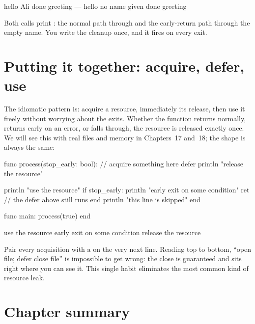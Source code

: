 \begin{progout}
hello
Ali
done greeting
---
hello
no name given
done greeting
\end{progout}

Both calls print : the normal path through  and
the early-return path through the empty name. You write the cleanup once, and it
fires on every exit.

\section{Putting it together: acquire, defer, use}

The idiomatic pattern is: acquire a resource, immediately  its
release, then use it freely without worrying about the exits. Whether the function
returns normally, returns early on an error, or falls through, the resource is
released exactly once. We will see this with real files and memory in Chapters~17
and~18; the shape is always the same:

\begin{salamen}
func process(stop_early: bool):
    // acquire something here
    defer println "release the resource"

    println "use the resource"
    if stop_early:
        println "early exit on some condition"
        ret               // the defer above still runs
    end
    println "this line is skipped"
end

func main:
    process(true)
end
\end{salamen}

\begin{progout}
use the resource
early exit on some condition
release the resource
\end{progout}

\begin{tip}
Pair every acquisition with a  on the very next line. Reading top to
bottom, ``open file; defer close file'' is impossible to get wrong: the close is
guaranteed and sits right where you can see it. This single habit eliminates the
most common kind of resource leak.
\end{tip}

\section{Chapter summary}

